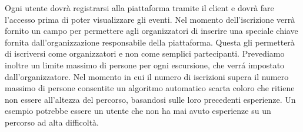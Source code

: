 Ogni utente dovrà registrarsi alla piattaforma tramite il client e dovrà fare l’accesso prima di poter visualizzare gli eventi. Nel momento dell’iscrizione verrà fornito un campo per permettere agli organizzatori di inserire una speciale chiave fornita dall’organizzazione responsabile della piattaforma. Questa gli permetterà di iscriversi come organizzatori e non come semplici partecipanti.
Prevediamo inoltre un limite massimo di persone per ogni escursione, che verrá impostato dall’organizzatore. Nel momento in cui il numero di iscrizioni supera il numero massimo di persone consentite un algoritmo automatico scarta coloro che ritiene non essere all’altezza del percorso, basandosi sulle loro precedenti esperienze. Un esempio potrebbe essere un utente che non ha mai avuto esperienze su un percorso ad alta difficoltà.